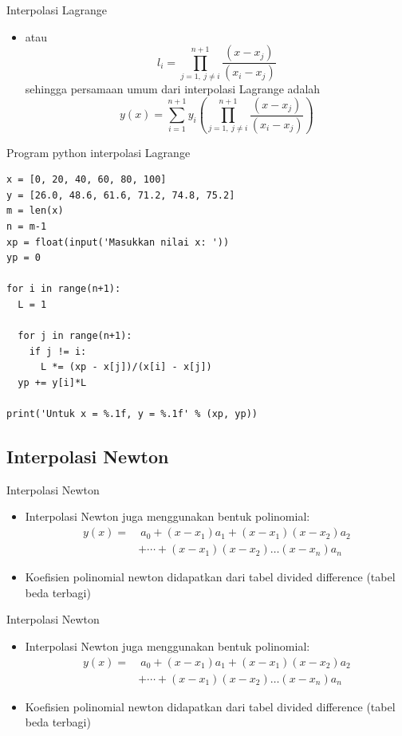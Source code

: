 \documentclass[pdflatex,compress,mathserif]{beamer}
\begin{document}
\begin{frame}{Interpolasi Lagrange}
	\begin{itemize}
		\item[]
		atau
		$$ l_i = \prod_{j = 1,~ j \neq i}^{n+1} \frac{(x-x_j)}{(x_i-x_j)} $$
		sehingga persamaan umum dari interpolasi Lagrange adalah
		$$ y(x) = \sum_{i=1}^{n+1} y_i \left( \prod_{j = 1,~ j \neq i}^{n+1} \frac{(x-x_j)}{(x_i-x_j)} \right) $$
	\end{itemize}
\end{frame}

\begin{frame}[fragile]{Program python interpolasi Lagrange}
	\begin{verbatim}
x = [0, 20, 40, 60, 80, 100]
y = [26.0, 48.6, 61.6, 71.2, 74.8, 75.2]
m = len(x)
n = m-1
xp = float(input('Masukkan nilai x: '))
yp = 0

for i in range(n+1):
  L = 1
  
  for j in range(n+1):
    if j != i:
	  L *= (xp - x[j])/(x[i] - x[j])
  yp += y[i]*L
  
print('Untuk x = %.1f, y = %.1f' % (xp, yp))
	\end{verbatim}
\end{frame}

\subsection{Interpolasi Newton}

\begin{frame}{Interpolasi Newton}
	\begin{itemize}
		\item Interpolasi Newton juga menggunakan bentuk polinomial:
		\begin{align*}
			y(x) =&~ a_0 + (x - x_1)a_1 + (x - x_1)(x - x_2)a_2 \\
			&+ \cdots + (x - x_1)(x - x_2) \dots (x - x_n)a_n
		\end{align*}
		\item Koefisien polinomial newton didapatkan dari tabel divided difference (tabel beda terbagi)
	\end{itemize}
\end{frame}

\begin{frame}{Interpolasi Newton}
	\begin{itemize}
		\item Interpolasi Newton juga menggunakan bentuk polinomial:
		\begin{align*}
			y(x) =&~ a_0 + (x - x_1)a_1 + (x - x_1)(x - x_2)a_2 \\
			&+ \cdots + (x - x_1)(x - x_2) \dots (x - x_n)a_n
		\end{align*}
		\item Koefisien polinomial newton didapatkan dari tabel divided difference (tabel beda terbagi)
	\end{itemize}
\end{frame}
\end{document}
